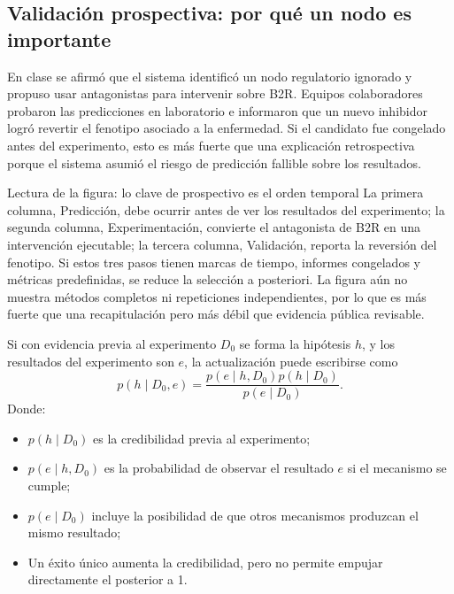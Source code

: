\subsection{Validación prospectiva: por qué un nodo es importante}

En clase se afirmó que el sistema identificó un nodo regulatorio ignorado y propuso usar antagonistas para intervenir sobre B2R. Equipos colaboradores probaron las predicciones en laboratorio e informaron que un nuevo inhibidor logró revertir el fenotipo asociado a la enfermedad. Si el candidato fue congelado antes del experimento, esto es más fuerte que una explicación retrospectiva porque el sistema asumió el riesgo de predicción fallible sobre los resultados.


\begin{knowledgebox}{Lectura de la figura: lo clave de prospectivo es el orden temporal}
La primera columna, Predicción, debe ocurrir antes de ver los resultados del experimento; la segunda columna, Experimentación, convierte el antagonista de B2R en una intervención ejecutable; la tercera columna, Validación, reporta la reversión del fenotipo. Si estos tres pasos tienen marcas de tiempo, informes congelados y métricas predefinidas, se reduce la selección a posteriori. La figura aún no muestra métodos completos ni repeticiones independientes, por lo que es más fuerte que una recapitulación pero más débil que evidencia pública revisable.
\end{knowledgebox}

Si con evidencia previa al experimento $D_0$ se forma la hipótesis $h$, y los resultados del experimento son $e$, la actualización puede escribirse como
$$
p(h\mid D_0,e)
=\frac{p(e\mid h,D_0)p(h\mid D_0)}
{p(e\mid D_0)}.
$$
Donde:
\begin{itemize}
  \item $p(h\mid D_0)$ es la credibilidad previa al experimento;
  \item $p(e\mid h,D_0)$ es la probabilidad de observar el resultado $e$ si el mecanismo se cumple;
  \item $p(e\mid D_0)$ incluye la posibilidad de que otros mecanismos produzcan el mismo resultado;
  \item Un éxito único aumenta la credibilidad, pero no permite empujar directamente el posterior a 1.
\end{itemize}


